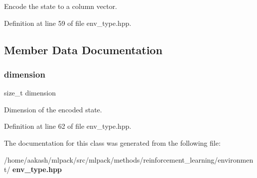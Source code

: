 Encode the state to a column vector. 



Definition at line 59 of file env\+\_\+type.\+hpp.



\subsection{Member Data Documentation}
\mbox{\label{classmlpack_1_1rl_1_1DiscreteActionEnv_1_1State_a389cd93f4e125d4369384464914be61f}} 
\subsubsection{dimension}
{\footnotesize\ttfamily size\+\_\+t dimension\hspace{0.3cm}{\ttfamily [static]}}



Dimension of the encoded state. 



Definition at line 62 of file env\+\_\+type.\+hpp.



The documentation for this class was generated from the following file\+:\begin{DoxyCompactItemize}
\item 
/home/aakash/mlpack/src/mlpack/methods/reinforcement\+\_\+learning/environment/\textbf{ env\+\_\+type.\+hpp}\end{DoxyCompactItemize}
